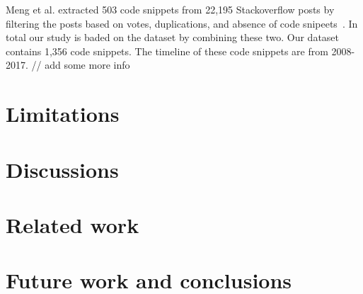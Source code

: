 \documentclass[sigconf]{acmart}
\begin{document}
  Meng et al.  extracted 503 code snippets from 22,195 Stackoverflow posts by filtering the posts based on votes, duplications, and absence of code snipeets~\cite{meng2018secure}. In total our study is baded on the dataset by combining these two. Our dataset contains 1,356 code snippets. The timeline of these code snippets are from 2008-2017.
  // add some more info      
\section{Limitations}
\section{Discussions}
\section{Related work}
\section{Future work and conclusions}


  
  

\end{document}
